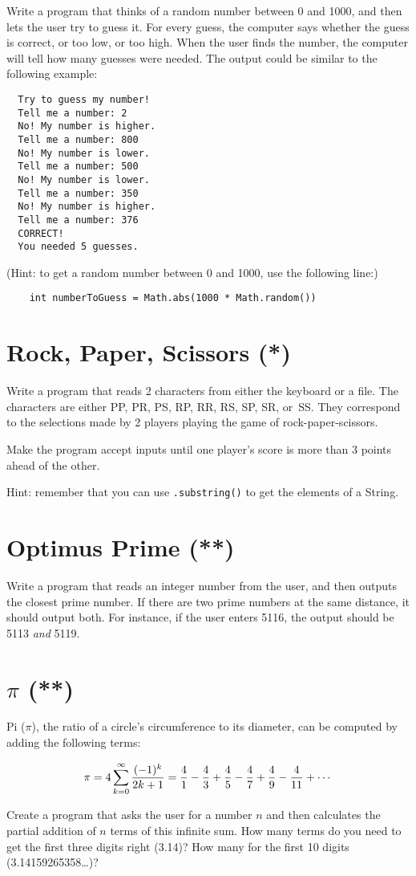 \documentclass{article}
\begin{document}
Write a program that thinks of a random number between 0 and 1000, and
then lets the user try to guess it. For every guess, the computer says
whether the guess is correct, or too low, or too high. When the user
finds the number, the computer will tell how many guesses were
needed. The output could be similar to the following example: 

\begin{verbatim}
  Try to guess my number!
  Tell me a number: 2
  No! My number is higher. 
  Tell me a number: 800
  No! My number is lower.
  Tell me a number: 500
  No! My number is lower.
  Tell me a number: 350
  No! My number is higher.
  Tell me a number: 376
  CORRECT!
  You needed 5 guesses. 
\end{verbatim}

(Hint: to get a random number between 0 and 1000, use the following
line:)

\begin{verbatim}
    int numberToGuess = Math.abs(1000 * Math.random())
\end{verbatim}

\section{Rock, Paper, Scissors (*)}
\label{sec:rock-paper-scissors}

Write a program that reads 2 characters from either the keyboard or a
file. The characters are either PP, PR, PS, RP, RR, RS, SP, SR,
or~SS. They correspond to the selections made by 2 players playing the 
game of rock-paper-scissors. 

Make the program accept inputs until one player's score is more than 3
points ahead of the other. 

Hint: remember that you can use \verb+.substring()+ to get the
elements of a String. 

\section{Optimus Prime (**)}
\label{sec:optimus-prime}

Write a program that reads an integer number from the user, and then
outputs the closest prime number. If there are two prime numbers at
the same distance, it should output both. For instance, if the user
enters 5116, the output should be 5113 \emph{and} 5119. 

\section{$\pi$ (**)}
\label{sec:pi-}

Pi ($\pi$), the ratio of a circle's circumference to its diameter, 
can be computed by adding the following terms: 

$$ \pi = 4 \sum^{\infty}_{k=0} {(-1)^k \over 2k+1} = 
  {4 \over 1} - {4 \over 3} + {4 \over 5} - {4 \over 7} 
  + {4 \over 9} - {4 \over 11} + \cdots $$

Create a program that asks the user for a number $n$ and then
calculates the partial addition of $n$ terms of this infinite sum. 
How many terms do you need to get
the first three digits right (3.14)? How many for the first 10 digits
(3.14159265358\ldots)?
\end{document}
